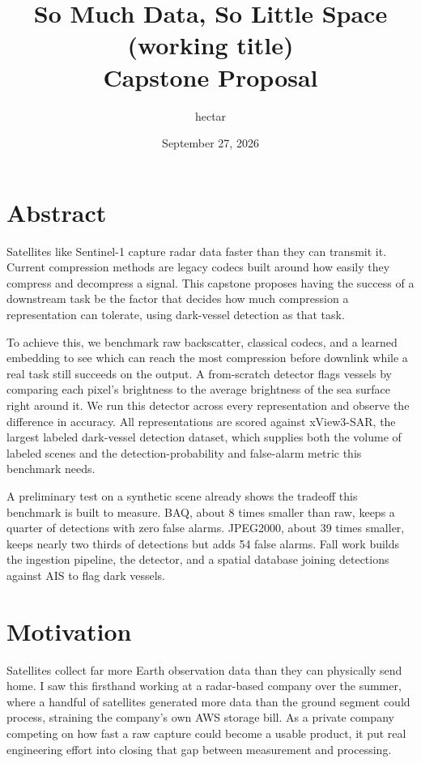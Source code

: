 \documentclass[11pt]{article}
\title{\textbf{So Much Data, So Little Space}\\\large (working title)\\\normalsize Capstone Proposal}
\author{hectar}
\date{September 27, 2026}
\begin{document}
\maketitle

\section*{Abstract}

Satellites like Sentinel-1 capture radar data faster than they can transmit it. Current compression methods are legacy codecs built around how easily they compress and decompress a signal. This capstone proposes having the success of a downstream task be the factor that decides how much compression a representation can tolerate, using dark-vessel detection as that task.

To achieve this, we benchmark raw backscatter, classical codecs, and a learned embedding to see which can reach the most compression before downlink while a real task still succeeds on the output. A from-scratch detector flags vessels by comparing each pixel's brightness to the average brightness of the sea surface right around it. We run this detector across every representation and observe the difference in accuracy. All representations are scored against xView3-SAR, the largest labeled dark-vessel detection dataset, which supplies both the volume of labeled scenes and the detection-probability and false-alarm metric this benchmark needs.

A preliminary test on a synthetic scene already shows the tradeoff this benchmark is built to measure. BAQ, about 8 times smaller than raw, keeps a quarter of detections with zero false alarms. JPEG2000, about 39 times smaller, keeps nearly two thirds of detections but adds 54 false alarms. Fall work builds the ingestion pipeline, the detector, and a spatial database joining detections against AIS to flag dark vessels.

\section{Motivation}

Satellites collect far more Earth observation data than they can physically send home. I saw this firsthand working at a radar-based company over the summer, where a handful of satellites generated more data than the ground segment could process, straining the company's own AWS storage bill. As a private company competing on how fast a raw capture could become a usable product, it put real engineering effort into closing that gap between measurement and processing.
\end{document}
